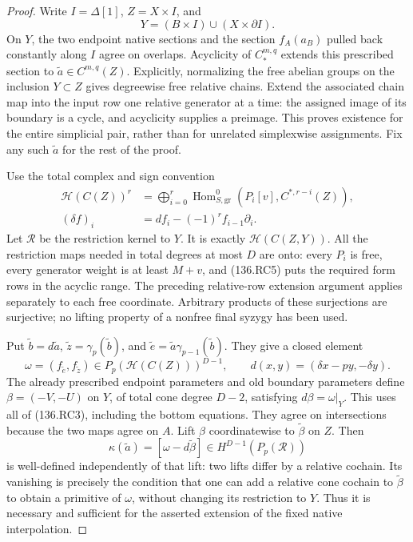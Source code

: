 \begin{proof}
Write \(I=\Delta[1]\), \(Z=X\times I\), and
\[
                         Y=(B\times I)\cup(X\times\partial I).
                                                               \tag{136.RC8}
\]
On \(Y\), the two endpoint native sections and the section
\(f_A(a_B)\) pulled back constantly along \(I\) agree on
overlaps. Acyclicity of \(C_*^{m,q}\) extends this prescribed
section to \(\widetilde a\in C^{m,q}(Z)\). Explicitly,
normalizing the free abelian groups on the inclusion \(Y\subset Z\)
gives degreewise free relative chains. Extend the associated chain
map into the input row one relative generator at a time: the
assigned image of its boundary is a cycle, and acyclicity supplies
a preimage. This proves existence for the entire simplicial pair,
rather than for unrelated simplexwise assignments. Fix any such
\(\widetilde a\) for the rest of the proof.

Use the total complex and sign convention
\[
\begin{split}
 \mathcal H(C(Z))^r
 &=\bigoplus_{i=0}^r\operatorname{Hom}^0_{S,\mathrm{gr}}
                        (P_i[v],C^{*,r-i}(Z)),\\
 (\delta f)_i&=df_i-(-1)^r f_{i-1}\partial_i.
\end{split}                                                \tag{136.RC9}
\]
Let \(\mathcal R\) be the restriction kernel to \(Y\).
It is exactly \(\mathcal H(C(Z,Y))\). All the restriction
maps needed in total degrees at most \(D\) are onto: every
\(P_i\) is free, every generator weight is at least \(M+v\),
and (136.RC5) puts the required form rows in the acyclic range.
The preceding relative-row extension argument applies separately
to each free coordinate. Arbitrary products of these surjections
are surjective; no lifting property of a nonfree final syzygy
has been used.

Put \(\widetilde b=d\widetilde a\),
\(\widetilde z=\gamma_p(\widetilde b)\), and
\(\widetilde e=\widetilde a\gamma_{p-1}(\widetilde b)\).
They give a closed element
\[
 \omega=(f_{\widetilde e},f_{\widetilde z})
       \in P_p(\mathcal H(C(Z)))^{D-1},\qquad
 d(x,y)=(\delta x-py,-\delta y).                           \tag{136.RC10}
\]
The already prescribed endpoint parameters and old boundary
parameters define \(\beta=(-V,-U)\) on \(Y\), of total
cone degree \(D-2\), satisfying \(d\beta=\omega|_Y\).
This uses all of (136.RC3), including the bottom equations.
They agree on intersections because the two maps agree on \(A\).
Lift \(\beta\) coordinatewise to \(\widetilde\beta\) on
\(Z\). Then
\[
          \kappa(\widetilde a)
             =[\omega-d\widetilde\beta]
                    \in H^{D-1}(P_p(\mathcal R))          \tag{136.RC11}
\]
is well-defined independently of that lift: two lifts differ by
a relative cochain. Its vanishing is precisely the condition that
one can add a relative cone cochain to \(\widetilde\beta\)
to obtain a primitive of \(\omega\), without changing its
restriction to \(Y\). Thus it is necessary and sufficient for
the asserted extension of the fixed native interpolation.


\end{proof}
